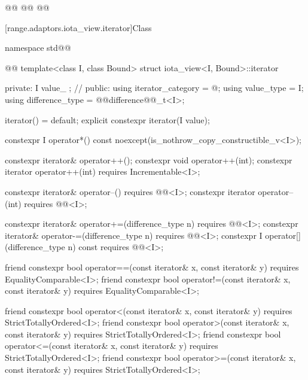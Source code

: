 \begin{itemdescr}
\pnum
\oldtxt{\returns}  

\pnum
{}
\begin{codeblock}
@@
@@
@@
\end{codeblock}
\end{itemdescr}

[range.adaptors.iota_view.iterator]{Class }

\begin{codeblock}
namespace std@@ { @@
  template<class I, class Bound>
  struct iota_view<I, Bound>::iterator {
  private:
    I value_ {}; // \expos
  public:
    using iterator_category = @\seebelownc@;
    using value_type = I;
    using difference_type = @@difference@@_t<I>;

    iterator() = default;
    explicit constexpr iterator(I value);

    constexpr I operator*() const noexcept(is_nothrow_copy_constructible_v<I>);

    constexpr iterator& operator++();
    constexpr void operator++(int);
    constexpr iterator operator++(int) requires Incrementable<I>;

    constexpr iterator& operator--() requires @@<I>;
    constexpr iterator operator--(int) requires @@<I>;

    constexpr iterator& operator+=(difference_type n)
      requires @@<I>;
    constexpr iterator& operator-=(difference_type n)
      requires @@<I>;
    constexpr I operator[](difference_type n) const
      requires @@<I>;

    friend constexpr bool operator==(const iterator& x, const iterator& y)
      requires EqualityComparable<I>;
    friend constexpr bool operator!=(const iterator& x, const iterator& y)
      requires EqualityComparable<I>;

    friend constexpr bool operator<(const iterator& x, const iterator& y)
      requires StrictTotallyOrdered<I>;
    friend constexpr bool operator>(const iterator& x, const iterator& y)
      requires StrictTotallyOrdered<I>;
    friend constexpr bool operator<=(const iterator& x, const iterator& y)
      requires StrictTotallyOrdered<I>;
    friend constexpr bool operator>=(const iterator& x, const iterator& y)
      requires StrictTotallyOrdered<I>;

}}
\end{codeblock}
